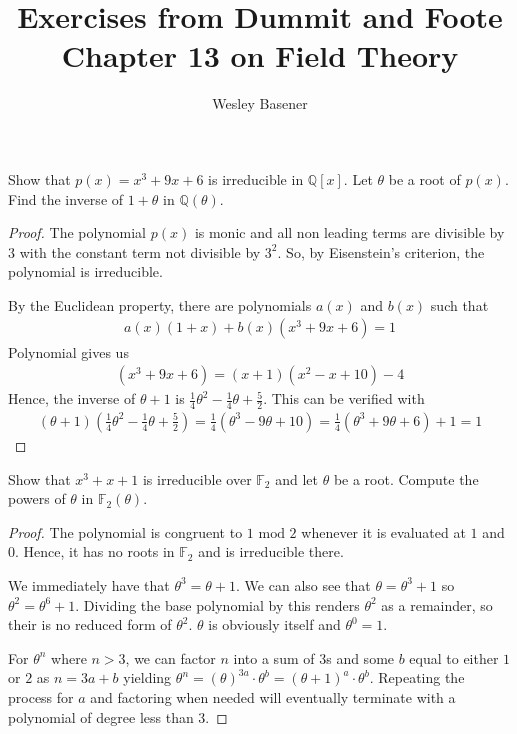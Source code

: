 \documentclass[10pt]{article}
\newcommand{\Q}{\mathbb{Q}}
\newenvironment{problem}[2][Problem]{\begin{trivlist}
		\item[\hskip \labelsep {\bfseries #1}\hskip \labelsep {\bfseries #2.}]}{\end{trivlist}}
\begin{document}
	
	\title{Exercises from Dummit and Foote Chapter 13 on Field Theory}
	\author{Wesley Basener}
	\maketitle
	\begin{problem}{1.1}
		Show that $p(x) = x^3 + 9x +6$ is irreducible in $\Q[x]$. Let $\theta$ be a root of $p(x)$. Find the inverse of $1 + \theta$ in $\Q(\theta)$.
		\begin{proof}
			The polynomial $p(x)$ is monic and all non leading terms are divisible by $3$ with the constant term not divisible by $3^2$. So, by Eisenstein's criterion, the polynomial is irreducible.
			
			By the Euclidean property, there are polynomials $a(x)$ and $b(x)$ such that
			\begin{align*}
				a(x)(1+x) + b(x)(x^3 + 9x + 6) = 1
			\end{align*}
			Polynomial gives us
			\begin{align*}
				(x^3 + 9x + 6) = (x+1)(x^2-x+10) - 4
			\end{align*}
			Hence, the inverse of $\theta + 1$ is $\frac{1}{4}\theta^2-\frac{1}{4}\theta+\frac{5}{2}$. This can be verified with
			\begin{align*}
				(\theta + 1)(\frac{1}{4}\theta^2-\frac{1}{4}\theta+\frac{5}{2}) = \frac{1}{4}(\theta^3 - 9\theta + 10) = \frac{1}{4}(\theta^3 + 9\theta + 6) + 1 = 1 
			\end{align*}
		\end{proof}
	\end{problem}
		
	\begin{problem}{1.3}
		Show that $x^3 + x + 1$ is irreducible over $\mathbb{F}_2$ and let $\theta$ be a root. Compute the powers of $\theta$ in $\mathbb{F}_2(\theta)$.
		\begin{proof}
			The polynomial is congruent to $1 \text{ mod }2$ whenever it is evaluated at $1$ and $0$. Hence, it has no roots in $\mathbb{F}_2$ and is irreducible there.
			
			We immediately have that $\theta^3 = \theta+1$. We can also see that $\theta = \theta^3+1$ so $\theta^2 = \theta^6 + 1$. Dividing the base polynomial by this renders $\theta^2$ as a remainder, so their is no reduced form of $\theta^2$. $\theta$ is obviously itself and $\theta^0=1$.
			
			For $\theta^n$ where $n>3$, we can factor $n$ into a sum of  $3$s and some $b$ equal to either $1$ or $2$ as $n=3a+b$ yielding $\theta^n = (\theta)^{3a} \cdot \theta^b = (\theta+1)^a\cdot\theta^b$. Repeating the process for $a$ and factoring when needed will eventually terminate with a polynomial of degree less than $3$.
		\end{proof}
	\end{problem}
	
\end{document}
